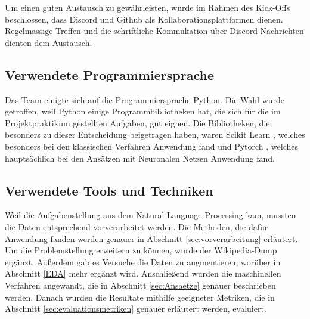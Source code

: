 Um einen guten Austausch zu gewährleisten, wurde im Rahmen des Kick-Offs beschlossen, dass Discord
und Github
als Kollaborationsplattformen dienen. Regelmässige Treffen und die schriftliche Kommukation über Discord Nachrichten dienten dem Austausch. %


\subsection{Verwendete Programmiersprache}
\label{Programmiersprache}
Das Team einigte sich auf die Programmiersprache Python.
Die Wahl wurde getroffen, weil Python einige Programmbibliotheken hat, die sich für die im Projektpraktikum gestellten Aufgaben, gut eignen. Die Bibliotheken, die besonders zu dieser Entscheidung beigetragen haben, waren Scikit Learn \cite{Pedregosa2011}, welches besonders bei den klassischen Verfahren Anwendung fand und Pytorch \cite{Ansel2024}, welches hauptsächlich bei den Ansätzen mit Neuronalen Netzen Anwendung fand.

\subsection{Verwendete Tools und Techniken}
\label{ToolsUndTechniken}
Weil die Aufgabenstellung aus dem Natural Language Processing kam, mussten die Daten entsprechend vorverarbeitet werden. Die Methoden, die dafür Anwendung fanden werden genauer in Abschnitt \ref{sec:vorverarbeitung} erläutert. Um die Problemstellung erweitern zu können, wurde der Wikipedia-Dump ergänzt. Außerdem gab es Versuche die Daten zu augmentieren, worüber in Abschnitt \ref{EDA} mehr ergänzt wird. Anschließend wurden die maschinellen Verfahren angewandt, die in Abschnitt \ref{sec:Ansaetze} genauer beschrieben werden. Danach wurden die Resultate mithilfe geeigneter Metriken, die in Abschnitt \ref{sec:evaluationsmetriken} genauer erläutert werden, evaluiert.